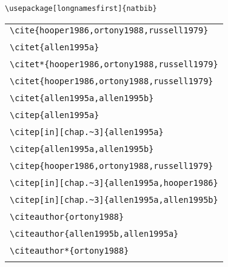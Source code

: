 \documentclass{article}
\begin{document}
\verb#\usepackage[longnamesfirst]{natbib}#\\

\begin{center}
\begin{tabular}{l}
\verb#\cite{hooper1986,ortony1988,russell1979}# \\
\cite{hooper1986,ortony1988,russell1979}  \\\hline \hline
%
\verb#\citet{allen1995a}# \\
 \citet{allen1995a} \\\hline
\verb#\citet*{hooper1986,ortony1988,russell1979}# \\
 \citet*{hooper1986,ortony1988,russell1979}  \\\hline
\verb#\citet{hooper1986,ortony1988,russell1979}# \\
 \citet{hooper1986,ortony1988,russell1979}  \\\hline
\verb#\citet{allen1995a,allen1995b}# \\
 \citet{allen1995a,allen1995b} \\\hline\hline
%
\verb#\citep{allen1995a}# \\
 \citep{allen1995a} \\\hline
\verb#\citep[in][chap.~3]{allen1995a}# \\
 \citep[in][chap.~3]{allen1995a} \\\hline
\verb#\citep{allen1995a,allen1995b}# \\
 \citep{allen1995a,allen1995b} \\\hline
\verb#\citep{hooper1986,ortony1988,russell1979}# \\
 \citep{hooper1986,ortony1988,russell1979}  \\\hline
\verb#\citep[in][chap.~3]{allen1995a,hooper1986}# \\
 \citep[in][chap.~3]{allen1995a,hooper1986} \\\hline
[Fails in 1.9.15] \verb#\citep[in][chap.~3]{allen1995a,allen1995b}# \\
 \citep[in][chap.~3]{allen1995a,allen1995b} \\\hline
%
\verb#\citeauthor{ortony1988}# \\
 \citeauthor{ortony1988} \\\hline
\verb#\citeauthor{allen1995b,allen1995a}# \\
 \citeauthor{allen1995b,allen1995a} \\\hline
\verb#\citeauthor*{ortony1988}# \\
 \citeauthor*{ortony1988} \\\hline

\end{tabular}
\end{center}
\end{document}
